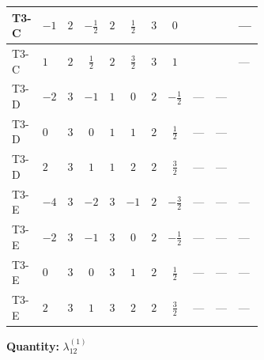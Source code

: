 \documentclass[8pt]{article}
\begin{document}
\begin{landscape}
\begin{longtable}{@{}llcccccc >{\raggedright\arraybackslash}p{0.21\linewidth} >{\raggedright\arraybackslash}p{0.21\linewidth} >{\raggedright\arraybackslash}p{0.21\linewidth}@{}}
\midrule
T3-C & $-1$ & $2$ & $-\frac{1}{2}$ & $2$ & $\frac{1}{2}$ & $3$ & $0$ & \scriptsize\adjustbox{max width=\linewidth}{$\begin{gathered} {\lambda_{12}^{(1)}} (3 T_{\nu}^{(1)}+3 T_{\nu}^{(2)})\end{gathered}$} & \scriptsize\adjustbox{max width=\linewidth}{$\begin{gathered} -\frac{9}{2} \operatorname{Tr}\!\left({y_1}\,\left({y_1}\right)^{\dagger}\,{y_2}\,\left({y_2}\right)^{\dagger}\right)\end{gathered}$} & --- \\
\midrule
T3-C & $1$ & $2$ & $\frac{1}{2}$ & $2$ & $\frac{3}{2}$ & $3$ & $1$ & \scriptsize\adjustbox{max width=\linewidth}{$\begin{gathered} {\lambda_{12}^{(1)}} (3 T_{\nu}^{(1)}+3 T_{\nu}^{(2)})\end{gathered}$} & \scriptsize\adjustbox{max width=\linewidth}{$\begin{gathered} -\frac{9}{2} \operatorname{Tr}\!\left({y_1}\,\left({y_1}\right)^{\dagger}\,{y_2}\,\left({y_2}\right)^{\dagger}\right)\end{gathered}$} & --- \\
\midrule
T3-D & $-2$ & $3$ & $-1$ & $1$ & $0$ & $2$ & $-\frac{1}{2}$ & --- & --- & \scriptsize\adjustbox{max width=\linewidth}{$\begin{gathered} {\lambda_{12}^{(1)}} (2 T_{\nu}^{(1)}+4 T_{\nu}^{(2)}+4 {\lambda_{S_1}^{(A)}})\end{gathered}$} \\
\midrule
T3-D & $0$ & $3$ & $0$ & $1$ & $1$ & $2$ & $\frac{1}{2}$ & --- & --- & \scriptsize\adjustbox{max width=\linewidth}{$\begin{gathered} {\lambda_{12}^{(1)}} (2 T_{\nu}^{(1)}+4 T_{\nu}^{(2)}+4 {\lambda_{S_1}^{(A)}})\end{gathered}$} \\
\midrule
T3-D & $2$ & $3$ & $1$ & $1$ & $2$ & $2$ & $\frac{3}{2}$ & --- & --- & \scriptsize\adjustbox{max width=\linewidth}{$\begin{gathered} {\lambda_{12}^{(1)}} (2 T_{\nu}^{(1)}+4 T_{\nu}^{(2)}+4 {\lambda_{S_1}^{(A)}})\end{gathered}$} \\
\midrule
T3-E & $-4$ & $3$ & $-2$ & $3$ & $-1$ & $2$ & $-\frac{3}{2}$ & --- & --- & --- \\
\midrule
T3-E & $-2$ & $3$ & $-1$ & $3$ & $0$ & $2$ & $-\frac{1}{2}$ & --- & --- & --- \\
\midrule
T3-E & $0$ & $3$ & $0$ & $3$ & $1$ & $2$ & $\frac{1}{2}$ & --- & --- & --- \\
\midrule
T3-E & $2$ & $3$ & $1$ & $3$ & $2$ & $2$ & $\frac{3}{2}$ & --- & --- & --- \\
\midrule
\bottomrule
\end{longtable}
\clearpage
\noindent\textbf{Quantity: }$\lambda_{12}^{(1)}$\par\smallskip

\end{landscape}
\end{document}
